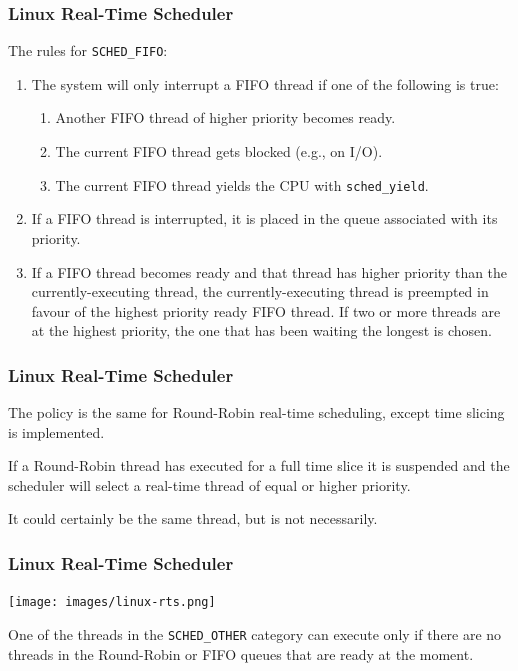 \begin{frame}
\frametitle{Linux Real-Time Scheduler}

The rules for \texttt{SCHED\_FIFO}:

\begin{enumerate}
	\item The system will only interrupt a FIFO thread if one of the following is true:
	\begin{enumerate}
		\item Another FIFO thread of higher priority becomes ready.
		\item The current FIFO thread gets blocked (e.g., on I/O).
		\item The current FIFO thread yields the CPU with \texttt{sched\_yield}.
	\end{enumerate}
	\item If a FIFO thread is interrupted, it is placed in the queue associated with its priority.
	\item If a FIFO thread becomes ready and that thread has higher priority than the currently-executing thread, the currently-executing thread is preempted in favour of the highest priority ready FIFO thread. If two or more threads are at the highest priority, the one that has been waiting the longest is chosen.
\end{enumerate}


\end{frame}

\begin{frame}
\frametitle{Linux Real-Time Scheduler}

The policy is the same for Round-Robin real-time scheduling, except time slicing is implemented. 

If a Round-Robin thread has executed for a full time slice it is suspended and the scheduler will select a real-time thread of equal or higher priority.

It could certainly be the same thread, but is not necessarily. 

\end{frame}

\begin{frame}
\frametitle{Linux Real-Time Scheduler}

\begin{center}
	\texttt{[image: images/linux-rts.png]}
\end{center}

One of the threads in the \texttt{SCHED\_OTHER} category can execute only if there are no threads in the Round-Robin or FIFO queues that are ready at the moment.


\end{frame}

